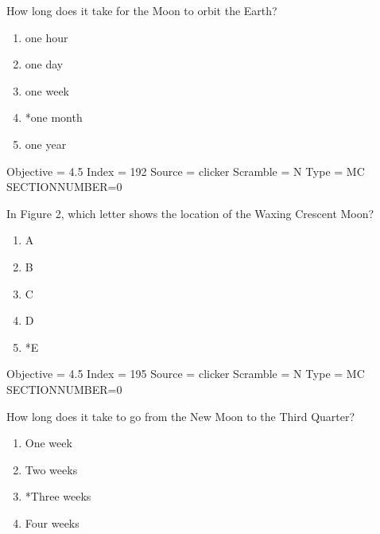 \documentclass[11pt]{article}
\begin{document}
\begin{enumerate}
\begin{minipage}{\textwidth}
\begin{minipage}{\textwidth}
\item How long does it take for the Moon to orbit the Earth?
\begin{multicols}{3}
\begin{enumerate} 
\setlength{\itemsep}{1pt} 
\setlength{\parskip}{0pt} 
\setlength{\parsep}{0pt}
\setlength{\multicolsep}{1pt} 
\item one hour
\item one day
\item one week
\item *one month
\item one year
\end{enumerate} 
\vfill 
\end{multicols}

Objective = 4.5
Index = 192
Source = clicker
Scramble = N
Type = MC
SECTIONNUMBER=0
\end{minipage}
\end{minipage}
\vskip 0.20in

\begin{minipage}{\textwidth}
\begin{minipage}{\textwidth}
\item In Figure 2, which letter shows the location of the Waxing Crescent Moon?
\begin{multicols}{3}
\begin{enumerate} 
\setlength{\itemsep}{1pt} 
\setlength{\parskip}{0pt} 
\setlength{\parsep}{0pt}
\setlength{\multicolsep}{1pt} 
\item A
\item B
\item C
\item D
\item *E
\end{enumerate} 
\vfill 
\end{multicols}

Objective = 4.5
Index = 195
Source = clicker
Scramble = N
Type = MC
SECTIONNUMBER=0
\end{minipage}
\end{minipage}
\vskip 0.20in

\begin{minipage}{\textwidth}
\begin{minipage}{\textwidth}
\item How long does it take to go from the New Moon to the Third Quarter?
\begin{multicols}{3}
\begin{enumerate} 
\setlength{\itemsep}{1pt} 
\setlength{\parskip}{0pt} 
\setlength{\parsep}{0pt}
\setlength{\multicolsep}{1pt} 
\item One week
\item Two weeks
\item *Three weeks
\item Four weeks
\end{enumerate} 
\vfill 
\end{multicols}


\end{minipage}
\end{minipage}
\end{enumerate}
\end{document}

